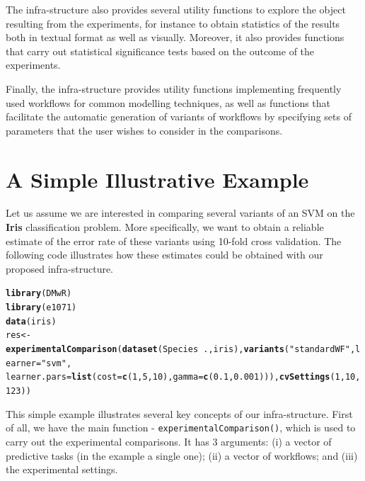 \documentclass[10pt,a4paper]{article}\usepackage[]{graphicx}\usepackage[]{color}
\makeatletter
\newcommand{\hlnum}[1]{\textcolor[rgb]{0.686,0.059,0.569}{#1}}%
\newcommand{\hlstr}[1]{\textcolor[rgb]{0.192,0.494,0.8}{#1}}%
\newcommand{\hlopt}[1]{\textcolor[rgb]{0,0,0}{#1}}%
\newcommand{\hlstd}[1]{\textcolor[rgb]{0.345,0.345,0.345}{#1}}%
\newcommand{\hlkwb}[1]{\textcolor[rgb]{0.69,0.353,0.396}{#1}}%
\newcommand{\hlkwc}[1]{\textcolor[rgb]{0.333,0.667,0.333}{#1}}%
\newcommand{\hlkwd}[1]{\textcolor[rgb]{0.737,0.353,0.396}{\textbf{#1}}}%
\newenvironment{kframe}{%
 \def\at@end@of@kframe{}%
 \ifinner\ifhmode%
  \def\at@end@of@kframe{\end{minipage}}%
  \begin{minipage}{\columnwidth}%
 \fi\fi%
 \def\FrameCommand##1{\hskip\@totalleftmargin \hskip-\fboxsep
 \colorbox{shadecolor}{##1}\hskip-\fboxsep
     \hskip-\linewidth \hskip-\@totalleftmargin \hskip\columnwidth}%
 \MakeFramed {\advance\hsize-\width
   \@totalleftmargin\z@ \linewidth\hsize
   \@setminipage}}%
 {\par\unskip\endMakeFramed%
 \at@end@of@kframe}
\newenvironment{knitrout}{}{} %
\makeatother
\begin{document}
The infra-structure also provides several utility functions
to explore the object resulting from the experiments, for instance to
obtain statistics of the results both in textual format as well as
visually. Moreover, it also provides functions that carry out
statistical significance tests based on the outcome of the
experiments. 

Finally, the infra-structure provides utility functions
implementing frequently used workflows for common modelling techniques, as
well as functions that facilitate the automatic generation of variants
of workflows by specifying sets of parameters that the user wishes to
consider in the comparisons.

\section{A Simple Illustrative Example}\label{sec:simpleEx}

Let us assume we are interested in comparing several variants of
an SVM on the
\textbf{Iris} classification problem. More specifically, we want to
obtain a reliable estimate of the error rate of these variants using
10-fold cross validation. The following code illustrates how these
estimates could be obtained with our proposed infra-structure.

\begin{knitrout}
\color{fgcolor}\begin{kframe}
\begin{alltt}
\hlkwd{library}\hlstd{(DMwR)}
\hlkwd{library}\hlstd{(e1071)}
\hlkwd{data}\hlstd{(iris)}
\hlstd{res} \hlkwb{<-} \hlkwd{experimentalComparison}\hlstd{(}\hlkwd{dataset}\hlstd{(Species} \hlopt{~} \hlstd{., iris),} \hlkwd{variants}\hlstd{(}\hlstr{"standardWF"}\hlstd{,} \hlkwc{learner} \hlstd{=} \hlstr{"svm"}\hlstd{,}
    \hlkwc{learner.pars} \hlstd{=} \hlkwd{list}\hlstd{(}\hlkwc{cost} \hlstd{=} \hlkwd{c}\hlstd{(}\hlnum{1}\hlstd{,} \hlnum{5}\hlstd{,} \hlnum{10}\hlstd{),} \hlkwc{gamma} \hlstd{=} \hlkwd{c}\hlstd{(}\hlnum{0.1}\hlstd{,} \hlnum{0.001}\hlstd{))),} \hlkwd{cvSettings}\hlstd{(}\hlnum{1}\hlstd{,} \hlnum{10}\hlstd{,} \hlnum{123}\hlstd{))}
\end{alltt}
\end{kframe}
\end{knitrout}


This simple example illustrates several key concepts of our
infra-structure. First of all, we have the main function  -
\texttt{experimentalComparison()}, which is used to carry out
the experimental comparisons. It has 3 arguments: (i) a vector of
predictive tasks (in the example a single one); (ii) a vector of workflows; and (iii) the
experimental settings. 
\end{document}
